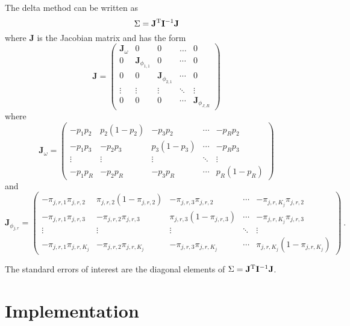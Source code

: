 \documentclass{article}
\newcommand{\T}{^\textup{T}}
\begin{document}
The delta method can be written as
\begin{equation}
    \Sigma = \mathbf{J}\T \mathbf{I}^{-1} \mathbf{J}
\end{equation}
where $\mathbf{J}$ is the Jacobian matrix and has the form
\begin{equation}
    \mathbf{J} =
    \begin{pmatrix}
        \mathbf{J}_\omega & 0 & 0 & \ldots & 0\\
        0 & \mathbf{J}_{\phi_{1,1}} & 0 & \cdots & 0\\
        0 & 0 & \mathbf{J}_{\phi_{2,1}} & \cdots & 0 \\
        \vdots & \vdots & \vdots & \ddots & \vdots \\
        0 & 0 & 0 & \cdots & \mathbf{J}_{\phi_{J,R}}
    \end{pmatrix}
\end{equation}
where
\begin{equation}
    \mathbf{J}_\omega =
    \begin{pmatrix}
        -p_1 p_2 & p_2 (1-p_2) & -p_3 p_2 & \cdots & -p_R p_2 \\
        -p_1 p_3 & -p_2 p_3 & p_3 (1-p_3) & \cdots & -p_R p_3\\
        \vdots & \vdots  & \vdots & \ddots & \vdots \\
        -p_1 p_R & -p_2 p_R & -p_3 p_R & \cdots & p_R (1-p_R)
    \end{pmatrix}
\end{equation}
and
\begin{equation}
    \mathbf{J}_{\phi_{j,r}} =
    \begin{pmatrix}
        -\pi_{j,r,1} \pi_{j,r,2} & \pi_{j,r,2} (1-\pi_{j,r,2}) & -\pi_{j,r,3} \pi_{j,r,2} & \cdots & -\pi_{j,r,K_j} \pi_{j,r,2} \\
        -\pi_{j,r,1} \pi_{j,r,3}& -\pi_{j,r,2} \pi_{j,r,3} & \pi_{j,r,3} (1-\pi_{j,r,3}) & \cdots & -\pi_{j,r,K_j} \pi_{j,r,3}\\
        \vdots & \vdots  & \vdots & \ddots & \vdots \\
        -\pi_{j,r,1} \pi_{j,r,K_j} & -\pi_{j,r,2} \pi_{j,r,K_j} & -\pi_{j,r,3} \pi_{j,r,K_j} & \cdots & \pi_{j,r,K_j} (1-\pi_{j,r,K_j})
    \end{pmatrix}
    \ .
\end{equation}

The standard errors of interest are the diagonal elements of $\Sigma = \mathbf{J}\T \mathbf{I}^{-1} \mathbf{J}$.

\section{Implementation}
\end{document}
